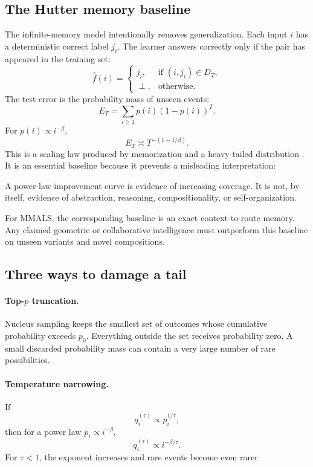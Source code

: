 \subsection{The Hutter memory baseline}

The infinite-memory model intentionally removes generalization. Each input $i$ has a deterministic correct label $j_i$. The learner answers correctly only if the pair has appeared in the training set:
\[
\widehat f(i)=
\begin{cases}
 j_i, & \text{if }(i,j_i)\in D_T,\\
 \perp, & \text{otherwise.}
\end{cases}
\]
The test error is the probability mass of unseen events:
\[
E_T = \sum_{i\ge 1}p(i)(1-p(i))^T.
\]
For $p(i)\propto i^{-\beta}$,
\[
E_T \asymp T^{-(1-1/\beta)}.
\]
This is a scaling law produced by memorization and a heavy-tailed distribution \citep{hutter2021learning}. It is an essential baseline because it prevents a misleading interpretation:

\begin{keyidea}
A power-law improvement curve is evidence of increasing coverage. It is not, by itself, evidence of abstraction, reasoning, compositionality, or self-organization.
\end{keyidea}

For MMALS, the corresponding baseline is an exact context-to-route memory. Any claimed geometric or collaborative intelligence must outperform this baseline on unseen variants and novel compositions.

\subsection{Three ways to damage a tail}

\paragraph{Top-$p$ truncation.} Nucleus sampling keeps the smallest set of outcomes whose cumulative probability exceeds $p_0$. Everything outside the set receives probability zero. A small discarded probability mass can contain a very large number of rare possibilities.

\paragraph{Temperature narrowing.} If
\[
q_i^{(\tau)} \propto p_i^{1/\tau},
\]
then for a power law $p_i\propto i^{-\beta}$,
\[
q_i^{(\tau)} \propto i^{-\beta/\tau}.
\]
For $\tau<1$, the exponent increases and rare events become even rarer.

